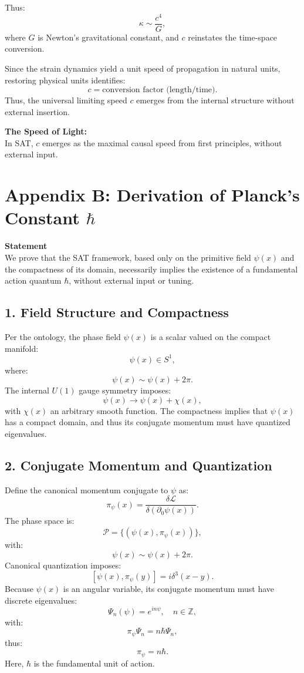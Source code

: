 \documentclass[12pt]{article}
\begin{document}
Thus:
\[
\kappa \sim \frac{c^4}{G},
\]
where \(G\) is Newton’s gravitational constant, and \(c\) reinstates the time-space conversion.

Since the strain dynamics yield a unit speed of propagation in natural units, restoring physical units identifies:
\[
c = \text{conversion factor (length/time)}.
\]
Thus, the universal limiting speed \(c\) emerges from the internal structure without external insertion.

\begin{mdframed}[linewidth=1pt]
\textbf{The Speed of Light:} \\
In SAT, \( c \) emerges as the maximal causal speed from first principles, without external input.
\end{mdframed}



\newpage
\section*{Appendix B: Derivation of Planck’s Constant \(\hbar\)}

\textbf{Statement} \\
We prove that the SAT framework, based only on the primitive field \(\psi(x)\) and the compactness of its domain, necessarily implies the existence of a fundamental action quantum \(\hbar\), without external input or tuning.

\subsection*{1. Field Structure and Compactness}
Per the ontology, the phase field \(\psi(x)\) is a scalar valued on the compact manifold:
\[
\psi(x) \in S^1,
\]
where:
\[
\psi(x) \sim \psi(x) + 2\pi.
\]
The internal \(U(1)\) gauge symmetry imposes:
\[
\psi(x) \to \psi(x) + \chi(x),
\]
with \(\chi(x)\) an arbitrary smooth function. The compactness implies that \(\psi(x)\) has a compact domain, and thus its conjugate momentum must have quantized eigenvalues.

\subsection*{2. Conjugate Momentum and Quantization}
Define the canonical momentum conjugate to \(\psi\) as:
\[
\pi_\psi(x) = \frac{\delta \mathcal{L}}{\delta(\partial_0 \psi(x))}.
\]
The phase space is:
\[
\mathcal{P} = \{ (\psi(x), \pi_\psi(x)) \},
\]
with:
\[
\psi(x) \sim \psi(x) + 2\pi.
\]
Canonical quantization imposes:
\[
[\psi(x), \pi_\psi(y)] = i \delta^3(x - y).
\]
Because \(\psi(x)\) is an angular variable, its conjugate momentum must have discrete eigenvalues:
\[
\Psi_n(\psi) = e^{i n \psi}, \quad n \in \mathbb{Z},
\]
with:
\[
\pi_\psi \Psi_n = n \hbar \Psi_n,
\]
thus:
\[
\pi_\psi = n \hbar.
\]
Here, \(\hbar\) is the fundamental unit of action.
\end{document}
